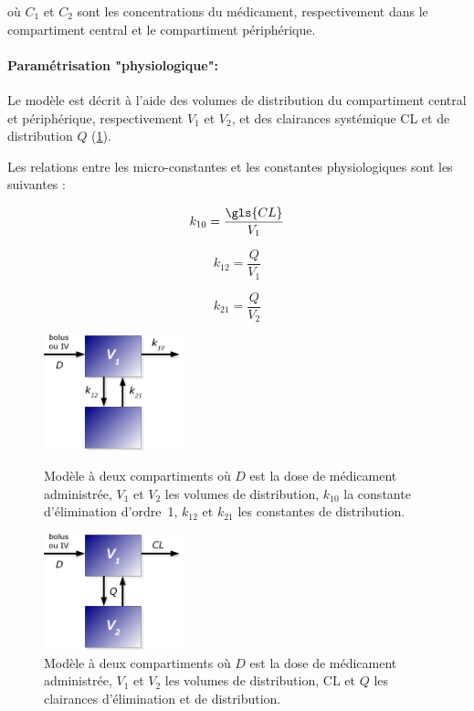 où $C_1$ et $C_2$ sont les concentrations du médicament, respectivement dans le compartiment central et le compartiment périphérique.

\paragraph*{Paramétrisation "physiologique":} Le modèle est décrit à l'aide des volumes de distribution du compartiment central et périphérique, respectivement $V_1$ et $V_2$, et des clairances systémique \gls{CL} et de distribution $Q$ (\ref{fig:5}). 

Les relations entre les micro-constantes et les constantes physiologiques sont les suivantes :

\begin{equation}
k_{10}  =  \frac{\gls{CL}}{V_1}
\label{eq:25}
\end{equation}

\begin{equation}
k_{12}  =  \frac{Q}{V_1}
\label{eq:26}
\end{equation}

\begin{equation}
k_{21}  =  \frac{Q}{V_2}
\label{eq:27}
\end{equation}

\begin{figure}[h!]
        \centering \includegraphics[width=4cm]{figures/raster/FIG_4}
        \caption[Modèle à deux compartiments (micro constantes]{Modèle à deux compartiments où $D$ est la dose de médicament administrée, $V_1$ et $V_2$ les volumes de distribution, $k_{10}$ la constante d'élimination d'ordre~1, $k_{12}$ et $k_{21}$ les constantes de distribution.}
	\label{fig:4}
        \centering \includegraphics[width=4cm]{figures/raster/FIG_5}
        \caption[Modèle à deux compartiments (constantes "physiologiques")]{Modèle à deux compartiments où $D$ est la dose de médicament administrée, $V_1$ et $V_2$ les volumes de distribution, \gls{CL} et $Q$ les clairances d'élimination et de distribution.}
	\label{fig:5}
\end{figure}

